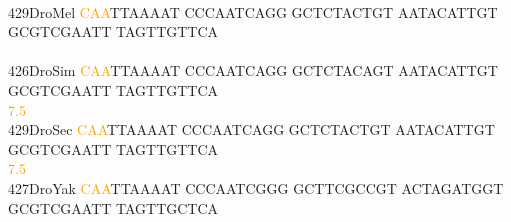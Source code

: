 \documentclass[11pt,twoside,reqno,a4paper]{article}
\begin{document}
{\\
429\hspace*{1\charwidth}DroMel	\textcolor{orange}{C}\textcolor{orange}{A}\textcolor{orange}{A}TTAAAAT	CCCAATCAGG	GCTCTACTGT	AATACATTGT	GCGTCGAATT	TAGTTGTTCA	\\
\hspace*{4\charwidth}\hspace*{7\charwidth}\hspace*{1\charwidth}\hspace*{1\charwidth}\hspace*{1\charwidth}\hspace*{1\charwidth}\hspace*{1\charwidth}\hspace*{1\charwidth}\\
426\hspace*{1\charwidth}DroSim	\textcolor{orange}{C}\textcolor{orange}{A}\textcolor{orange}{A}TTAAAAT	CCCAATCAGG	GCTCTACAGT	AATACATTGT	GCGTCGAATT	TAGTTGTTCA	\\
\hspace*{4\charwidth}\hspace*{7\charwidth}\hspace*{0\charwidth}\textcolor{orange}{7.5}\hspace*{1\charwidth}\hspace*{1\charwidth}\hspace*{1\charwidth}\hspace*{1\charwidth}\hspace*{1\charwidth}\hspace*{1\charwidth}\\
429\hspace*{1\charwidth}DroSec	\textcolor{orange}{C}\textcolor{orange}{A}\textcolor{orange}{A}TTAAAAT	CCCAATCAGG	GCTCTACTGT	AATACATTGT	GCGTCGAATT	TAGTTGTTCA	\\
\hspace*{4\charwidth}\hspace*{7\charwidth}\hspace*{0\charwidth}\textcolor{orange}{7.5}\hspace*{1\charwidth}\hspace*{1\charwidth}\hspace*{1\charwidth}\hspace*{1\charwidth}\hspace*{1\charwidth}\hspace*{1\charwidth}\\
427\hspace*{1\charwidth}DroYak	\textcolor{orange}{C}\textcolor{orange}{A}\textcolor{orange}{A}TTAAAAT	CCCAATCGGG	GCTTCGCCGT	ACTAGATGGT	GCGTCGAATT	TAGTTGCTCA	\\
}
\end{document}
